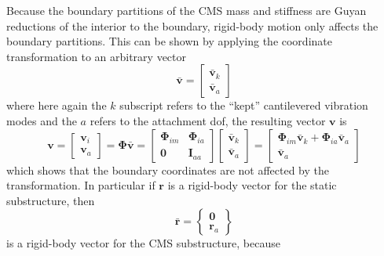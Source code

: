 \documentclass[10pt,openany,twoside]{book}
\numberwithin{equation}{section}   %
\newcommand{\Matrix}[1]{\boldsymbol{#1}}
\newcommand{\Vector}[1]{\boldsymbol{#1}}
\begin{document}
Because the boundary partitions of the CMS mass and stiffness
are Guyan reductions of the interior to the boundary, rigid-body
motion only affects the boundary partitions. This can be shown
by applying
the coordinate transformation to an arbitrary vector
\begin{equation}
\Vector{\bar{v}} = \left[
\begin{array}{c}
\Vector{\bar{v}}_k \\
\Vector{\bar{v}}_a
\end{array}
\right]				\nonumber
\end{equation}
where here again the $k$
subscript refers to the ``kept'' cantilevered vibration modes and the
$a$ refers to the attachment dof, the resulting vector $\Vector{v}$ is
\begin{equation}
\Vector{v} = \left[
\begin{array}{c}
\Vector{v}_i \\
\Vector{v}_a
\end{array}
\right] = \Matrix{\Phi} \Vector{\bar{v}} = \left[
\begin{array}{cc}
\Matrix{\Phi}_{im} & \Matrix{\Phi}_{ia} \\
\Matrix{0} & \Matrix{I}_{aa}
\end{array}
\right] \left[
\begin{array}{c}
\Matrix{\bar{v}}_k \\
\Matrix{\bar{v}}_a
\end{array}
\right] = \left[
\begin{array}{c}
\Matrix{\Phi}_{im} \Vector{\bar{v}}_k + \Matrix{\Phi}_{ia} \Vector{\bar{v}}_a \\
\Vector{\bar{v}}_{a}
\end{array}
\right]			\nonumber
\end{equation}
which shows that the boundary coordinates are not affected by the
transformation. In particular if $\Matrix{r}$ is a rigid-body vector
for the static substructure, then
\begin{equation}
\Vector{\bar{r}} = \left\{
        \begin{array}{c}
                \Vector{0}                \\
                \Vector{r}_{a}
        \end{array}
\right\}					\nonumber
\end{equation}
is a rigid-body vector for the CMS substructure, because
\end{document}
